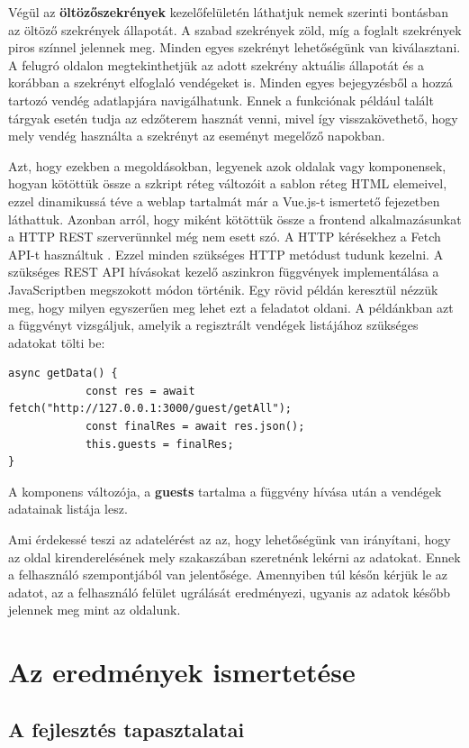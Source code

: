 \documentclass[12pt]{article}
\begin{document}
Végül az \textbf{öltözőszekrények} kezelőfelületén láthatjuk nemek szerinti bontásban az öltöző szekrények állapotát. A szabad szekrények zöld, míg a foglalt szekrények piros színnel jelennek meg. Minden egyes szekrényt lehetőségünk van kiválasztani. A felugró oldalon megtekinthetjük az adott szekrény aktuális állapotát és a korábban a szekrényt elfoglaló vendégeket is. Minden egyes bejegyzésből a hozzá tartozó vendég adatlapjára navigálhatunk. Ennek a funkciónak például talált tárgyak esetén tudja az edzőterem hasznát venni, mivel így visszakövethető, hogy mely vendég használta a szekrényt az eseményt megelőző napokban.

Azt, hogy ezekben a megoldásokban, legyenek azok oldalak vagy komponensek, hogyan kötöttük össze a szkript réteg változóit a sablon réteg HTML elemeivel, ezzel dinamikussá téve a weblap tartalmát már a Vue.js-t ismertető fejezetben láthattuk. Azonban arról, hogy miként kötöttük össze a frontend alkalmazásunkat a HTTP REST szerverünnkel még nem esett szó. A HTTP kérésekhez a Fetch API-t használtuk \cite{FETCH_API}. Ezzel minden szükséges HTTP metódust tudunk kezelni. A szükséges REST API hívásokat kezelő aszinkron függvények implementálása a JavaScriptben megszokott módon történik. Egy rövid példán keresztül nézzük meg, hogy milyen egyszerűen meg lehet ezt a feladatot oldani. A példánkban azt a függvényt vizsgáljuk, amelyik a regisztrált vendégek listájához szükséges adatokat tölti be:
\begin{verbatim}
async getData() {
            const res = await fetch("http://127.0.0.1:3000/guest/getAll");
            const finalRes = await res.json();
            this.guests = finalRes;
}
\end{verbatim}

A komponens változója, a \textbf{guests} tartalma a függvény hívása után a vendégek adatainak listája lesz.

Ami érdekessé teszi az adatelérést az az, hogy lehetőségünk van irányítani, hogy az oldal kirenderelésének mely szakaszában szeretnénk lekérni az adatokat. Ennek a felhasználó szempontjából van jelentősége. Amennyiben túl későn kérjük le az adatot, az a felhasználó felület ugrálását eredményezi, ugyanis az adatok később jelennek meg mint az oldalunk.

\newpage
\section{Az eredmények ismertetése}
\subsection{A fejlesztés tapasztalatai}
\end{document}
